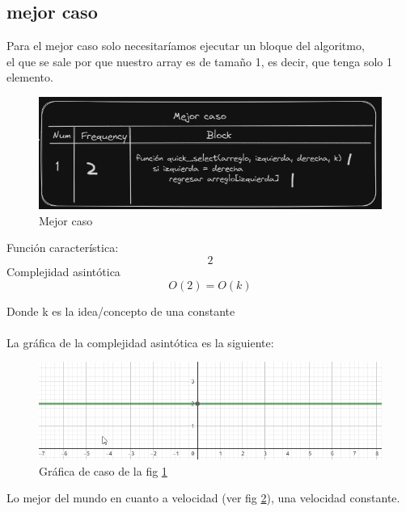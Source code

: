 \documentclass{article}
\begin{document}
\subsection*{mejor caso}
Para el mejor caso solo necesitaríamos ejecutar un bloque del algoritmo,\\
el que se sale por que nuestro array es de tamaño 1, es decir, que tenga solo 1 elemento. 
\begin{figure}[H]
  \centering
  \includegraphics[scale=0.8]{../imgs/q2.png}
  \caption{Mejor caso}
  \label{Fig:1}
\end{figure}

  Función característica: 
  \begin{equation*}
    2 
  \end{equation*}
  Complejidad asintótica
  \begin{equation*}
    O(2) = O(k)
  \end{equation*}

  Donde k es la idea/concepto de una constante\\
  \\
  La gráfica de la complejidad asintótica es la siguiente: 
  \begin{figure}[H]
    \centering
    \includegraphics[scale=0.8]{../imgs/q4.png}
    \caption{Gráfica de caso de la fig \ref{Fig:1}}
    \label{Fig:2}
  \end{figure}

  Lo mejor del mundo en cuanto a velocidad (ver fig \ref{Fig:2}), una velocidad constante.
\end{document}
